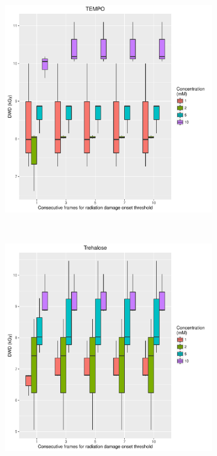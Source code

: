 \begin{figure}
    \ContinuedFloat
    \centering
    \begin{subfigure}[b]{0.75\textwidth}
            \centering
            \includegraphics[width=\textwidth]{figures/saxs/TEMPO_Num_consec_fr_comp.pdf}
            \caption{}
            \label{}
    \end{subfigure}
    \\
    \begin{subfigure}[b]{0.75\textwidth}
            \centering
            \includegraphics[width=\textwidth]{figures/saxs/Trehalose_Num_consec_fr_comp.pdf}

\end{subfigure}
\end{figure}
